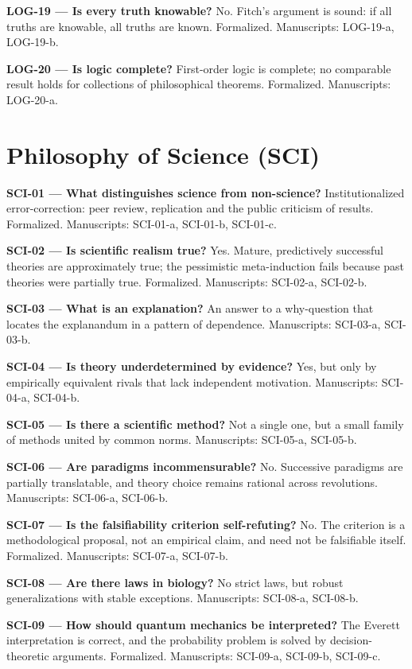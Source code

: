 \documentclass[10pt]{article}
\begin{document}
\textbf{LOG-19 --- Is every truth knowable?} No. Fitch's argument is sound: if all truths are knowable, all truths are known. Formalized. Manuscripts: LOG-19-a, LOG-19-b.

\textbf{LOG-20 --- Is logic complete?} First-order logic is complete; no comparable result holds for collections of philosophical theorems. Formalized. Manuscripts: LOG-20-a.

\section*{Philosophy of Science (SCI)}
\textbf{SCI-01 --- What distinguishes science from non-science?} Institutionalized error-correction: peer review, replication and the public criticism of results. Formalized. Manuscripts: SCI-01-a, SCI-01-b, SCI-01-c.

\textbf{SCI-02 --- Is scientific realism true?} Yes. Mature, predictively successful theories are approximately true; the pessimistic meta-induction fails because past theories were partially true. Formalized. Manuscripts: SCI-02-a, SCI-02-b.

\textbf{SCI-03 --- What is an explanation?} An answer to a why-question that locates the explanandum in a pattern of dependence. Manuscripts: SCI-03-a, SCI-03-b.

\textbf{SCI-04 --- Is theory underdetermined by evidence?} Yes, but only by empirically equivalent rivals that lack independent motivation. Manuscripts: SCI-04-a, SCI-04-b.

\textbf{SCI-05 --- Is there a scientific method?} Not a single one, but a small family of methods united by common norms. Manuscripts: SCI-05-a, SCI-05-b.

\textbf{SCI-06 --- Are paradigms incommensurable?} No. Successive paradigms are partially translatable, and theory choice remains rational across revolutions. Manuscripts: SCI-06-a, SCI-06-b.

\textbf{SCI-07 --- Is the falsifiability criterion self-refuting?} No. The criterion is a methodological proposal, not an empirical claim, and need not be falsifiable itself. Formalized. Manuscripts: SCI-07-a, SCI-07-b.

\textbf{SCI-08 --- Are there laws in biology?} No strict laws, but robust generalizations with stable exceptions. Manuscripts: SCI-08-a, SCI-08-b.

\textbf{SCI-09 --- How should quantum mechanics be interpreted?} The Everett interpretation is correct, and the probability problem is solved by decision-theoretic arguments. Formalized. Manuscripts: SCI-09-a, SCI-09-b, SCI-09-c.
\end{document}
